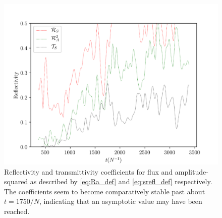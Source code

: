 \documentclass[
        fleqn,
        usenatbib,
    ]{mnras}
\newcommand*{\abs}[1]{\left|#1\right|}
\begin{document}
\begin{figure}[t]
    \centering
    \includegraphics[width=\columnwidth]{plots/nl_f_refl.png}
    \caption{Reflectivity and transmittivity coefficients for flux and
    amplitude-squared as described by \autoref{eq:Ra_def} and
    \autoref{eq:srefl_def} respectively. The coefficients seem to become
    comparatively stable past about $t = 1750/N$, indicating that an asymptotic
    value may have been reached.}\label{fig:nl_f_refl}
\end{figure}

\end{document}
